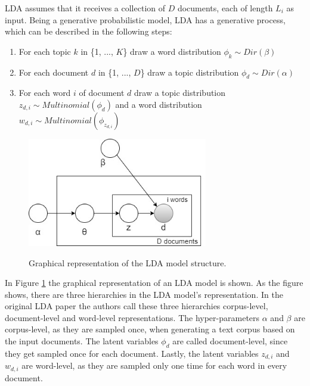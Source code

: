             LDA assumes that it receives a collection of $D$ documents, each of length $L_i$ as input. Being a generative probabilistic model, LDA has a generative process, which can be described in the following steps:
            
            \begin{enumerate}
                \item For each topic $k$ in \{1, ..., $K$\} draw a word distribution $\phi_k \sim Dir(\beta)$
                \item For each document $d$ in \{1, ..., $D$\} draw a topic distribution $\phi_d \sim Dir(\alpha)$
                \item For each word $i$ of document $d$ draw a topic distribution $z_{d,i} \sim Multinomial(\phi_d)$ and a word distribution $w_{d,i} \sim Multinomial(\phi_{z_{d,i}})$
            \end{enumerate}
            
            \begin{figure}[!ht]
              \centering
              \includegraphics[width=0.7\textwidth]{figures/LDA_graphical.jpg}\\
              \caption{Graphical representation of the LDA model structure.}
              \label{fig:LDA_graph}
            \end{figure}
            
            In Figure \ref{fig:LDA_graph} the graphical representation of an LDA model is shown. As the figure shows, there are three hierarchies in the LDA model's representation. In the original LDA paper \cite{blei2003latent} the authors call these three hierarchies corpus-level, document-level and word-level representations. The hyper-parameters $\alpha$ and $\beta$ are corpus-level, as they are sampled once, when generating a text corpus based on the input documents. The latent variables $\phi_d$ are called document-level, since they get sampled once for each document. Lastly, the latent variables $z_{d,i}$ and $w_{d,i}$ are word-level, as they are  sampled only one time for each word in every document.
            
